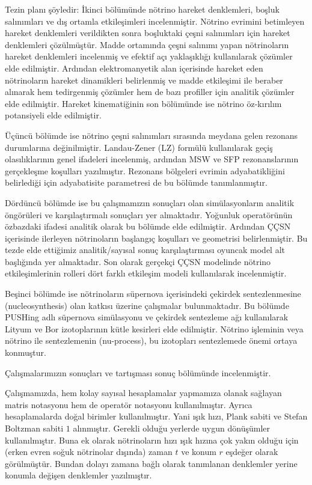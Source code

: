 Tezin planı şöyledir: İkinci bölümünde nötrino hareket denklemleri, boşluk salınımları ve dış ortamla etkileşimleri incelenmiştir. Nötrino evrimini betimleyen hareket denklemleri verildikten sonra boşluktaki çeşni salınımları için hareket denklemleri çözülmüştür. Madde ortamında çeşni salınımı yapan nötrinoların hareket denklemleri incelenmiş ve efektif açı yaklaşıklığı kullanılarak çözümler elde edilmiştir. Ardından elektromanyetik alan içerisinde hareket eden nötrinoların hareket dinamikleri belirlenmiş ve madde etkileşimi ile beraber alınarak hem tedirgenmiş çözümler hem de bazı profiller için analitik çözümler elde edilmiştir. Hareket kinematiğinin son bölümünde ise nötrino öz-kırılım potansiyeli elde edilmiştir.

Üçüncü bölümde ise nötrino çeşni salınımları sırasında meydana gelen rezonans durumlarına değinilmiştir. Landau-Zener (LZ) formülü kullanılarak geçiş olasılıklarının genel ifadeleri incelenmiş, ardından MSW ve SFP rezonanslarının gerçekleşme koşulları yazılmıştır. Rezonans bölgeleri evrimin adyabatikliğini belirlediği için adyabatisite parametresi de bu bölümde tanımlanmıştır.

Dördüncü bölümde ise bu çalışmamızın sonuçları olan simülasyonların analitik öngörüleri ve karşılaştırmalı sonuçları yer almaktadır. Yoğunluk operatörünün özbazdaki ifadesi analitik olarak bu bölümde elde edilmiştir. Ardından ÇÇSN içerisinde ilerleyen nötrinoların başlangıç koşulları ve geometrisi belirlenmiştir. Bu tezde elde ettiğimiz analitik/sayısal sonuç karşılaştırması oyuncak model alt başlığında yer almaktadır. Son olarak gerçekçi ÇÇSN modelinde nötrino etkileşimlerinin rolleri dört farklı etkileşim modeli kullanılarak incelenmiştir.

Beşinci bölümde ise nötrinoların süpernova içerisindeki çekirdek sentezlenmesine (nucleosynthesis) olan katkısı üzerine çalışmalar bulunmaktadır. Bu bölümde PUSHing adlı süpernova simülasyonu ve çekirdek sentezleme ağı kullanılarak Lityum ve Bor izotoplarının kütle kesirleri elde edilmiştir. Nötrino işleminin veya nötrino ile sentezlemenin (nu-process), bu izotopları sentezlemede önemi ortaya konmuştur.

Çalışmalarımızın sonuçları ve tartışması sonuç bölümünde incelenmiştir.

Çalışmamızda, hem kolay sayısal hesaplamalar yapmamıza olanak sağlayan matris notasyonu hem de operatör notasyonu kullanılmıştır. Ayrıca hesaplamalarda doğal birimler kullanılmıştır. Yani ışık hızı, Plank sabiti ve Stefan Boltzman sabiti $ 1 $ alınmıştır. Gerekli olduğu yerlerde uygun dönüşümler kullanılmıştır. Buna ek olarak nötrinoların hızı ışık hızına çok yakın olduğu için (erken evren soğuk nötrinolar dışında) zaman $ t $ ve konum $ r $ eşdeğer olarak görülmüştür. Bundan dolayı zamana bağlı olarak tanımlanan denklemler yerine konumla değişen denklemler yazılmıştır.